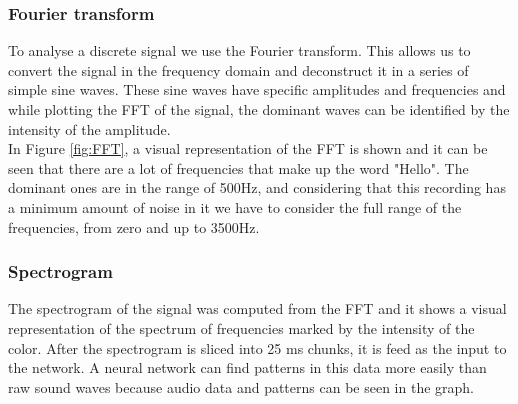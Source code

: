 
\subsubsection{ Fourier transform}

To analyse a discrete signal we use the Fourier transform. This allows us to convert the signal in the frequency domain and deconstruct it in a series of simple sine waves. These sine waves have specific amplitudes and frequencies and while plotting the FFT of the signal, the dominant waves can be identified by the intensity of the amplitude.\\

In Figure \ref{fig:FFT}, a visual representation of the FFT is shown and it can be seen that there are a lot of frequencies that make up the word "Hello". The dominant ones are in the range of 500Hz, and considering that this recording has a minimum amount of noise in it we have to consider the full range of the frequencies, from zero and up to 3500Hz.



\subsubsection{ Spectrogram}

The spectrogram of the signal was computed from the FFT and it shows a visual representation of the spectrum of frequencies marked by the intensity of the color. After the spectrogram is sliced into 25 ms chunks, it is feed as the input to the network. A neural network can find patterns in this data more easily than raw sound waves because audio data and patterns can be seen in the graph.


